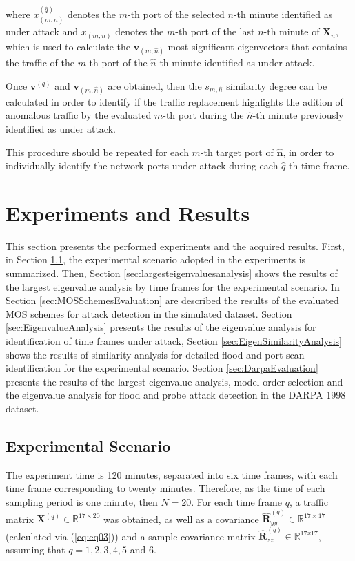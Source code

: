 \documentclass[review]{elsarticle}
\begin{document}
where $x^{(\hat{q})}_{(m,\hat{n})}$ denotes the $m$-th port of the selected $n$-th minute identified as under attack and $x_{(m,n)}$ denotes the $m$-th port of the last $n$-th minute of $\boldsymbol{X}_n$, which is used to calculate the $\boldsymbol{v}_{(m,\hat{n})}$ most significant eigenvectors that contains the traffic of the $m$-th port of the $\hat{n}$-th minute identified as under attack.

Once $\boldsymbol{v}^{(q)}$ and $\boldsymbol{v}_{(m,\hat{n})}$ are obtained, then the $s_{m,\hat{n}}$ similarity degree can be calculated in order to identify if the traffic replacement highlights the adition of anomalous traffic by the evaluated $m$-th port during the $\hat{n}$-th minute previously identified as under attack. 

This procedure should be repeated for each $m$-th target port of $\boldsymbol{\hat{n}}$, in order to individually identify the network ports under attack during each $\hat{q}$-th time frame.

\section{Experiments and Results}
\label{sec:experimentalresults}

This section presents the performed experiments and the acquired results. First, in Section \ref{sec:AnalyzedScenario}, the experimental scenario adopted in the experiments is summarized. Then, Section \ref{sec:largesteigenvaluesanalysis} shows the results of the largest eigenvalue analysis by time frames for the experimental scenario. In Section \ref{sec:MOSSchemesEvaluation} are described the results of the evaluated MOS schemes for attack detection in the simulated dataset. Section \ref{sec:EigenvalueAnalysis} presents the results of the eigenvalue analysis for identification of time frames under attack, Section \ref{sec:EigenSimilarityAnalysis} shows the results of similarity analysis for detailed flood and port scan identification for the experimental scenario. Section \ref{sec:DarpaEvaluation} presents the results of the largest eigenvalue analysis, model order selection and the eigenvalue analysis for flood and probe attack detection in the DARPA 1998 dataset.

\subsection{Experimental Scenario}
\label{sec:AnalyzedScenario}

The experiment time is 120 minutes, separated into six time frames, with each time frame corresponding to twenty minutes. Therefore, as the time of each sampling period is one minute, then $N = 20$. For each time frame $q$, a traffic matrix $\boldsymbol{X}^{(q)} \in \mathbb{R}^{17 \times 20}$ was obtained, as well as a covariance $\boldsymbol{\hat{R}}_{yy}^{(q)} \in \mathbb{R}^{17 \times 17}$ (calculated via (\ref{eq:eq03})) and a sample covariance matrix $\boldsymbol{\hat{R}}_{zz}^{(q)} \in \mathbb{R}^{17x17}$, assuming that $q = 1, 2, 3, 4, 5$ and $6$. 
\end{document}

